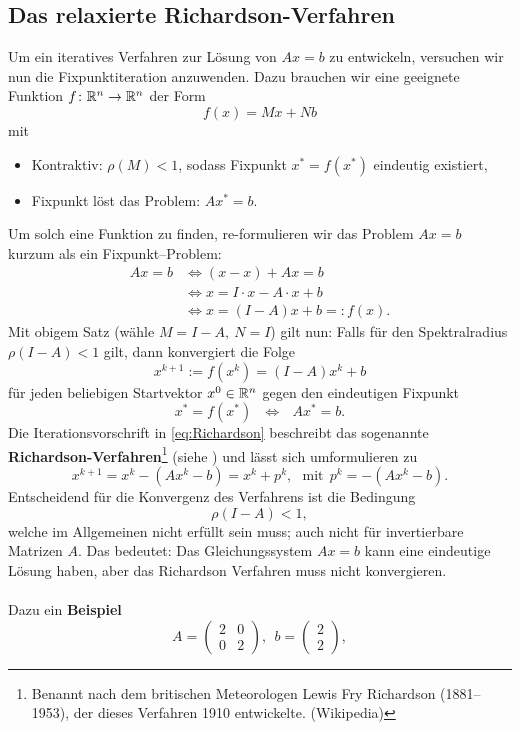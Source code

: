 \subsection{Das relaxierte Richardson-Verfahren}
Um ein iteratives Verfahren zur Lösung von $Ax=b$ zu entwickeln, versuchen wir nun die Fixpunktiteration anzuwenden. Dazu brauchen wir eine geeignete Funktion $f\colon {\mathbb{R}}^{n} \to {\mathbb{R}}^{n}$ der Form $$f(x) = Mx+Nb$$ mit 
\begin{itemize}
	\item Kontraktiv: $\rho(M)<1$, sodass Fixpunkt $x^* = f(x^*)$ eindeutig existiert,
	\item Fixpunkt löst das Problem: $Ax^* = b$.
\end{itemize}
Um solch eine Funktion zu finden, re-formulieren wir das Problem $Ax=b$ kurzum als ein Fixpunkt--Problem:
\begin{align*}
Ax = b  &\Leftrightarrow (x-x) + Ax = b \\
&\Leftrightarrow x = I\cdot x - A \cdot x + b\\
 &\Leftrightarrow x = (I-A)x + b =: f(x).
\end{align*}
Mit obigem Satz (wähle $M=I-A,~ N=I$) gilt nun: Falls für den Spektralradius $\rho(I-A)<1$ gilt, dann konvergiert die Folge 
\begin{equation} \label{eq:Richardson}
 x^{k+1} := f(x^k) = (I-A)x^k + b  
\end{equation} 
für jeden beliebigen Startvektor $x^0 \in {\mathbb{R}}^{n}$ gegen den eindeutigen Fixpunkt 
$$x^* = f(x^*) ~~~\Leftrightarrow~~~Ax^* = b. $$
Die Iterationsvorschrift in \eqref{eq:Richardson} beschreibt das sogenannte \textbf{Richardson-Verfahren}\footnote{Benannt nach dem britischen Meteorologen Lewis Fry Richardson (1881--1953), der dieses Verfahren 1910 entwickelte. (Wikipedia)} (siehe \cite[Kap. 4.1.4]{Meister}) und lässt sich umformulieren zu
\begin{equation*} 
x^{k+1} = x^k - (Ax^k - b) = x^k + p^k, ~~~\text{mit}~~p^k = - (Ax^k - b).  
\end{equation*}
Entscheidend für die Konvergenz des Verfahrens ist die Bedingung 
$$\rho(I-A)<1,$$
welche im Allgemeinen nicht erfüllt sein muss; auch nicht für invertierbare Matrizen $A$. Das bedeutet: Das Gleichungssystem $Ax=b$ kann eine eindeutige Lösung haben, aber das Richardson Verfahren muss nicht konvergieren.\\~\\
Dazu ein \textbf{Beispiel}
$$A = \begin{pmatrix}2&0\\0&2\end{pmatrix},~~b = \begin{pmatrix}2\\2\end{pmatrix}, $$
